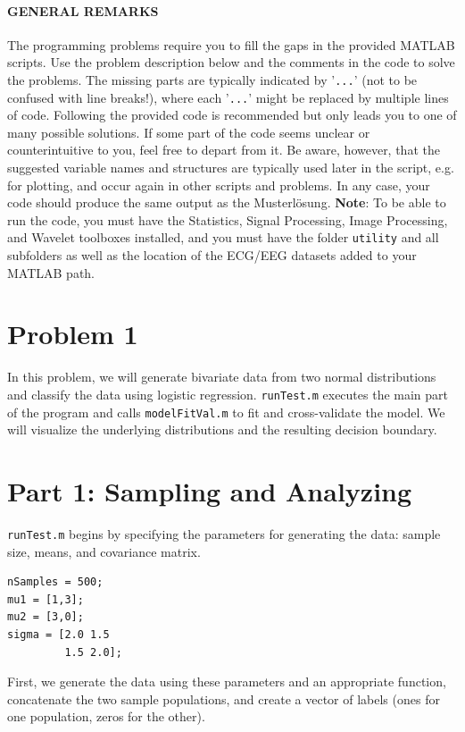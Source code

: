 \documentclass[10pt,a4paper,notitlepage]{report}
\begin{document}
\paragraph*{GENERAL REMARKS} The programming problems require you to fill the gaps in the provided MATLAB scripts. Use the problem description below and the comments in the code to solve the problems. The missing parts are typically indicated by '\texttt{...}' (not to be confused with line breaks!), where each '\texttt{...}' might be replaced by multiple lines of code. Following the provided code is recommended but only leads you to one of many possible solutions. If some part of the code seems unclear or counterintuitive to you, feel free to depart from it. Be aware, however, that the suggested variable names and structures are typically used later in the script, e.g. for plotting, and occur again in other scripts and problems. In any case, your code should produce the same output as the Musterlösung. \textbf{Note}: To be able to run the code, you must have the Statistics, Signal Processing, Image Processing, and Wavelet toolboxes installed, and you must have the folder \texttt{utility} and all subfolders as well as the location of the ECG/EEG datasets added to your MATLAB path.

\section*{Problem 1}
In this problem, we will generate bivariate data from two normal distributions and classify the data using logistic regression. \texttt{runTest.m} executes the main part of the program and calls \texttt{modelFitVal.m} to fit and cross-validate the model. We will visualize the underlying distributions and the resulting decision boundary.

\section*{Part 1: Sampling and Analyzing}
\texttt{runTest.m} begins by specifying the parameters for generating the data: sample size, means, and covariance matrix.

\begin{verbatim}
nSamples = 500;
mu1 = [1,3];
mu2 = [3,0];
sigma = [2.0 1.5
         1.5 2.0];
\end{verbatim}

First, we generate the data using these parameters and an appropriate function, concatenate the two sample populations, and create a vector of labels (ones for one population, zeros for the other).
\end{document}
